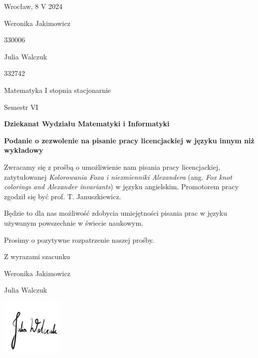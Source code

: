 \documentclass[12pt]{article}
\begin{document}
\thispagestyle{empty}
\begin{flushright}
  Wrocław, 8 V 2024
\end{flushright}

Weronika Jakimowicz

330006

Julia Walczuk 

332742

Matematyka I stopnia stacjonarnie

Semestr VI
\vspace{1.5cm}

\begin{flushright}
  \begin{varwidth}{7cm}\large\bfseries
    Dziekanat Wydziału Matematyki i Informatyki
  \end{varwidth}
\end{flushright}

\vspace{1.5cm}

\begin{center}\noindent
\begin{varwidth}{9cm}\centering
\textbf{Podanie o zezwolenie na pisanie pracy licencjackiej w języku innym niż wykładowy}
\end{varwidth}
\end{center}
\vspace{1cm}

Zwracamy się z prośbą o umożliwienie nam pisania pracy licencjackiej, zatytułowanej \emph{Kolorowania Foxa i niezmienniki Alexandera} (ang. \emph{Fox knot colorings and Alexander invariants}) w języku angielskim. Promotorem pracy zgodził się być prof. T. Januszkiewicz.
\medskip

Będzie to dla nas możliwość zdobycia umiejętności pisania prac w języku używanym powszechnie w świecie naukowym.
\medskip

Prosimy o pozytywne rozpatrzenie naszej prośby.
\vspace{.5cm}

\begin{flushright}
  Z wyrazami szacunku
  \vspace{.8cm}

  Weronika Jakimowicz
  \vspace{1.8cm}

  Julia Walczuk

  \includegraphics[width=3cm]{podpis.jpg}
\end{flushright}
\end{document}
